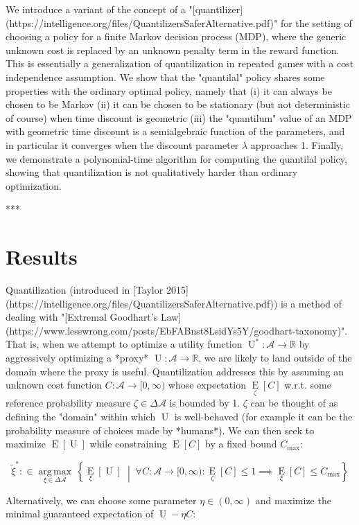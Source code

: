 \documentclass[a4paper]{article}
\newcommand{\AB}[1]{\left[#1\right]}
\newcommand{\ACM}[2]{\left\{#1\;\middle\vert\;#2\right\}}
\newcommand{\Ea}[2]{\underset{#1}{\operatorname{E}}\AB{#2}}
\newcommand{\Argmax}[1]{\underset{#1}{\operatorname{arg\,max}}\,}
\newcommand{\Reals}{\mathbb{R}}
\newcommand{\A}{\mathcal{A}}
\newcommand{\Ut}{\operatorname{U}}
\newcommand{\Co}{C}
\begin{document}
We introduce a variant of the concept of a "[quantilizer](https://intelligence.org/files/QuantilizersSaferAlternative.pdf)" for the setting of choosing a policy for a finite Markov decision process (MDP), where the generic unknown cost is replaced by an unknown penalty term in the reward function. This is essentially a generalization of quantilization in repeated games with a cost independence assumption. We show that the "quantilal" policy shares some properties with the ordinary optimal policy, namely that (i) it can always be chosen to be Markov (ii) it can be chosen to be stationary (but not deterministic of course) when time discount is geometric (iii) the "quantilum" value of an MDP with geometric time discount is a semialgebraic function of the parameters, and in particular it converges when the discount parameter $\lambda$ approaches 1. Finally, we demonstrate a polynomial-time algorithm for computing the quantilal policy, showing that quantilization is not qualitatively harder than ordinary optimization.

***

\section{Results}

Quantilization (introduced in [Taylor 2015](https://intelligence.org/files/QuantilizersSaferAlternative.pdf)) is a method of dealing with "[Extremal Goodhart's Law](https://www.lesswrong.com/posts/EbFABnst8LsidYs5Y/goodhart-taxonomy)". That is, when we attempt to optimize a utility function $\Ut^*: \A \rightarrow \Reals$ by aggressively optimizing a *proxy* $\Ut: \A \rightarrow \Reals$, we are likely to land outside of the domain where the proxy is useful. Quantilization addresses this by assuming an unknown cost function $\Co: \A \rightarrow [0,\infty)$ whose expectation $\Ea{\zeta}{\Co}$ w.r.t. some reference probability measure $\zeta \in \Delta\A$ is bounded by 1. $\zeta$ can be thought of as defining the "domain" within which $\Ut$ is well-behaved (for example it can be the probability measure of choices made by *humans*). We can then seek to maximize $\Ea{}{\Ut}$ while constraining $\Ea{}{\Co}$ by a fixed bound $C_{\max}$:

$$\tilde{\xi}^* :\in \Argmax{\xi \in \Delta\A}\ACM{\Ea{\xi}{\Ut}}{\forall \Co: \A \rightarrow [0,\infty): \Ea{\zeta}{\Co} \leq 1 \implies \Ea{\xi}{\Co} \leq C_{\max}}$$

Alternatively, we can choose some parameter $\eta\in(0,\infty)$ and maximize the minimal guaranteed expectation of $\Ut-\eta \Co$:
\end{document}
